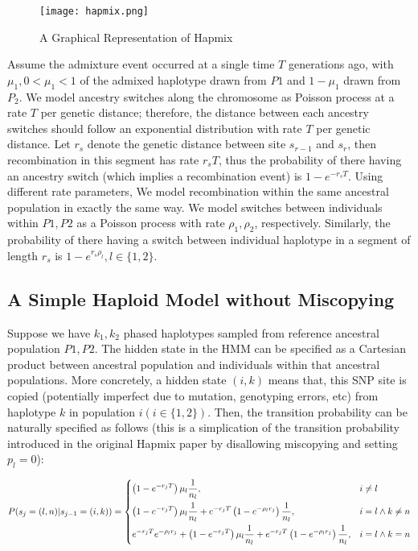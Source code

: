 \documentclass{article}
\begin{document}
    \begin{figure}[H]
        \texttt{[image: hapmix.png]}
        \centering
        \caption{A Graphical Representation of Hapmix \cite{hapmix}} \label{fig:hapmix}
    \end{figure}
    
    
    Assume the admixture event occurred at a single time $T$ generations ago, with $\mu_1,0<\mu_1<1$ of the admixed haplotype drawn from $P1$ and $1-\mu_1$ drawn from $P_2$. We model ancestry switches along the chromosome as Poisson process at a rate $T$ per genetic distance; therefore, the distance between each ancestry switches should follow an exponential distribution with rate $T$ per genetic distance. Let $r_s$ denote the genetic distance between site $s_{r-1}$ and $s_r$, then recombination in this segment has rate $r_sT$, thus the probability of there having an ancestry switch (which implies a recombination event) is $1-e^{-r_sT}$. Using different rate parameters, We model recombination within the same ancestral population in exactly the same way. We model switches between individuals within $P1,P2$ as a Poisson process with rate $\rho_1,\rho_2$, respectively. Similarly, the probability of there having a switch between individual haplotype in a segment of length $r_s$ is $1-e^{r_s\rho_l},l\in \{1,2\}$.  
    
    
    
    
\subsection{A Simple Haploid Model without Miscopying}

Suppose we have $k_1,k_2$ phased haplotypes sampled from reference ancestral population $P1,P2$. The hidden state in the HMM can be specified as a Cartesian product between ancestral population and individuals within that ancestral populations. More concretely, a hidden state $(i,k)$ means that, this SNP site is copied (potentially imperfect due to mutation, genotyping errors, etc) from haplotype $k$ in population $i(i\in \{1,2\})$. Then, the transition probability can be naturally specified as follows (this is a simplication of the transition probability introduced in the original Hapmix paper \cite{hapmix} by disallowing miscopying and setting $p_l=0$):

\[
P(s_j=(l,n)|s_{j-1}=(i,k))=
\begin{dcases}
\left(1-e^{-r_jT}\right)\mu_l\frac{1}{n_l}, &i\neq l\\
\left(1-e^{-r_j T}\right)\mu_l\frac{1}{n_l}+e^{-r_j T}\left(1-e^{-\rho_l r_j}\right)\frac{1}{n_l}, &i=l \land k\neq n\\
e^{-r_j T}e^{-\rho_l r_j}+\left(1-e^{-r_j T}\right)\mu_l\frac{1}{n_l}+e^{-r_j T}\left(1-e^{-\rho_l r_j}\right)\frac{1}{n_l}, &i=l \land k= n
\end{dcases}
\]
\end{document}

